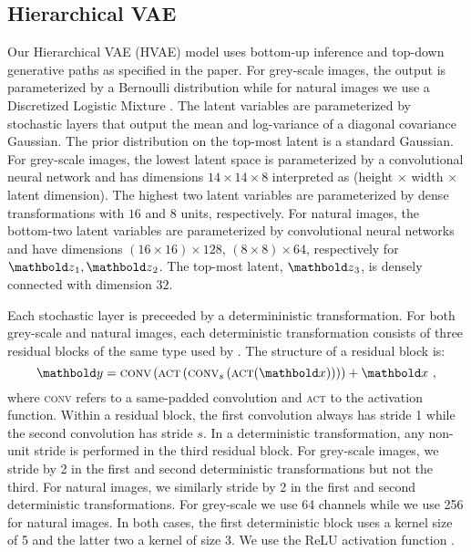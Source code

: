 {\subsection{Hierarchical VAE}
Our Hierarchical VAE (HVAE) model uses bottom-up inference and top-down generative paths as specified in the paper.
For grey-scale images, the output is parameterized by a Bernoulli distribution while for natural images we use a Discretized Logistic Mixture \parencite{salimans_pixelcnn_2017}.
The latent variables are parameterized by stochastic layers that output the mean and log-variance of a diagonal covariance Gaussian. The prior distribution on the top-most latent is a standard Gaussian.
For grey-scale images, the lowest latent space is parameterized by a convolutional neural network and has dimensions $14\times14\times8$ interpreted as (height $\times$ width $\times$ latent dimension). The highest two latent variables are parameterized by dense transformations with $16$ and $8$ units, respectively.
For natural images, the bottom-two latent variables are parameterized by convolutional neural networks and have dimensions $(16\times16)\times128$, $(8\times8)\times64$, respectively for $\zb_1, \zb_2$. The top-most latent, $\zb_3$, is densely connected with dimension $32$.

Each stochastic layer is preceeded by a determininistic transformation.
For both grey-scale and natural images, each deterministic transformation consists of three residual blocks of the same type used by \textcite{maaloe_biva_2019}. The structure of a residual block is:
\begin{equation}
    \yb = \textsc{conv}\left( \textsc{act} \left( \textsc{conv}_s \left( \textsc{act}(\xb) \right) \right) \right) + \xb \ ,
\end{equation}
where \textsc{conv} refers to a same-padded convolution and \textsc{act} to the activation function. Within a residual block, the first convolution always has stride 1 while the second convolution has stride $s$. In a deterministic transformation, any non-unit stride is performed in the third residual block. For grey-scale images, we stride by 2 in the first and second deterministic transformations but not the third. For natural images, we similarly stride by 2 in the first and second deterministic transformations. For grey-scale we use 64 channels while we use 256 for natural images.
In both cases, the first deterministic block uses a kernel size of 5 and the latter two a kernel of size 3. We use the ReLU activation function \parencite{fukushima_neocognitron_1980, nair_rectified_2010}.

}
